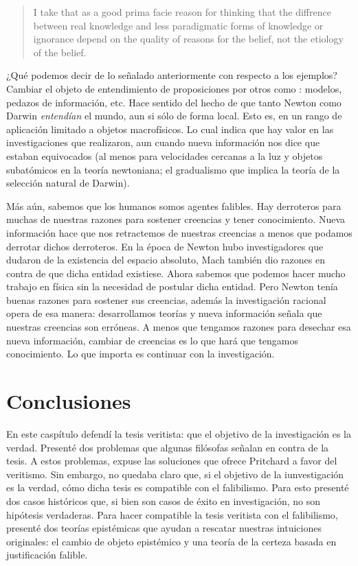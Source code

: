 \documentclass{article}
\begin{document}
\begin{quote}
I take that as a good prima facie reason for thinking that the diffrence between real knowledge and less paradigmatic forms of knowledge or ignorance depend on the quality of reasons for the belief, not the etiology of the belief. \cite[p~.403]{Klein2019}
\end{quote}

¿Qué podemos decir de lo señalado anteriormente con respecto a los ejemplos? Cambiar el objeto de entendimiento de proposiciones por otros como : modelos, pedazos de información, etc. Hace sentido del hecho de que tanto Newton como Darwin \textit{entendían} el mundo, aun si sólo de forma local. Esto es, en un rango de aplicación limitado a objetos macrofísicos. Lo cual indica que hay valor en las investigaciones que realizaron, aun cuando nueva información nos dice que estaban equivocados (al menos para velocidades cercanas a la luz y objetos subatómicos en la teoría newtoniana; el gradualismo que implica la teoría de la selección natural de Darwin). 

Más aún, sabemos que los humanos somos agentes falibles. Hay derroteros para muchas de nuestras razones para sostener creencias y tener conocimiento. Nueva información hace que nos retractemos de nuestras creencias a menos que podamos derrotar dichos derroteros. En la época de Newton hubo investigadores que dudaron de la existencia del espacio absoluto, Mach también dio razones en contra de que dicha entidad existiese. Ahora sabemos que podemos hacer mucho trabajo en física sin la necesidad de postular dicha entidad. Pero Newton tenía buenas razones para sostener sus creencias, además la investigación racional opera de esa manera: desarrollamos teorías y nueva información señala que nuestras creencias son erróneas. A menos que tengamos razones para desechar esa nueva información, cambiar de creencias es lo que hará que tengamos conocimiento. Lo que importa es continuar con la investigación.


\section{Conclusiones}

En este caspítulo defendí la tesis veritista: que el objetivo de la investigación es la verdad. Presenté dos problemas que algunas filósofas señalan en contra de la tesis. A estos problemas, expuse las soluciones que ofrece Pritchard a favor del veritismo. Sin embargo, no quedaba claro que, si el objetivo de la iunvestigación es la verdad, cómo dicha tesis es compatible con el falibilismo. Para esto presenté dos casos históricos que, si bien son casos de éxito en investigación, no son hipótesis verdaderas. Para hacer compatible la tesis veritista con el falibilismo, presenté dos teorías epistémicas que ayudan a rescatar nuestras intuiciones originales: el cambio de objeto epistémico y una teoría de la certeza basada en justificación falible.
\end{document}
